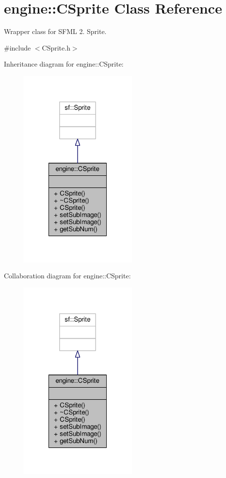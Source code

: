 \hypertarget{classengine_1_1CSprite}{\section{engine\-:\-:C\-Sprite Class Reference}
\label{classengine_1_1CSprite}
}


Wrapper class for S\-F\-M\-L 2. Sprite.  




{\ttfamily \#include $<$C\-Sprite.\-h$>$}



Inheritance diagram for engine\-:\-:C\-Sprite\-:
\nopagebreak
\begin{figure}[H]
\begin{center}
\leavevmode
\includegraphics[width=168pt]{classengine_1_1CSprite__inherit__graph}
\end{center}
\end{figure}


Collaboration diagram for engine\-:\-:C\-Sprite\-:
\nopagebreak
\begin{figure}[H]
\begin{center}
\leavevmode
\includegraphics[width=168pt]{classengine_1_1CSprite__coll__graph}
\end{center}
\end{figure}
